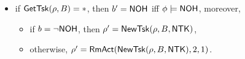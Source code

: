 {\begin{itemize}
\begin{itemize}
\begin{itemize}
\begin{itemize}
\begin{itemize}
\begin{itemize}
\begin{itemize}
						\item otherwise ($\getrealtsk(\rho,B) = S_1$ and $\zeta_i = \mainflag$ or $\getrealtsk(\rho,B) = * \wedge\gettsk(\rho,B) = S_1$), 
						\begin{itemize}
							\item if $\phi\models\stpflag$ and $A = B$, or $\phi \models\stpflag\wedge\pitflag$ and $\preact(\rho) = B$, then $\rho' = \rho$ and $b' = b$, 
							\item otherwise, $b' = \nohflag$ iff $\phi \models \nohflag$, moreover, 
							\begin{itemize}
								\item if $b = \neg \nohflag$, then $\rho'=\push(\rho, B)$,
								\item otherwise, $\rho' = \rmact(\push(\rho, B), 1, 2)$, 
							\end{itemize}
						\end{itemize}
					\end{itemize}
				\end{itemize}
			\end{itemize}
		\end{itemize}
	\end{itemize}
	\item if $\mathsf{GetTsk}(\rho, B) = *$, then $b' = \nohflag$ iff $\phi \models \nohflag$, moreover, 
		\begin{itemize}
			\item if $b = \neg \nohflag$, then $\rho' = \mathsf{NewTsk}(\rho, B, {\sf NTK})$, 
			\item otherwise, $\rho' = \mathsf{RmAct}(\mathsf{NewTsk}(\rho, B, {\sf NTK}), 2, 1)$.
		\end{itemize}				
	\end{itemize}
\end{itemize}
}
